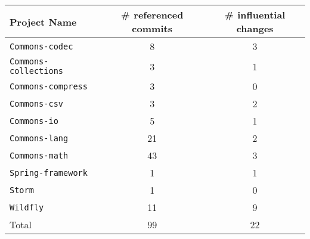 \centering
\resizebox{0.8\linewidth}{!}
{
\begin{tabular}{lcc}
    Project Name & \# referenced commits & \# influential changes\\
\toprule

{\tt Commons-codec} & 8 & 3 \\
{\tt Commons-collections} & 3 & 1 \\
{\tt Commons-compress} & 3 & 0 \\
{\tt Commons-csv} & 3 & 2 \\
{\tt Commons-io} & 5 & 1 \\
{\tt Commons-lang} & 21 & 2 \\
{\tt Commons-math} & 43 & 3 \\
{\tt Spring-framework} & 1 & 1 \\
{\tt Storm} & 1 & 0 \\
{\tt Wildfly} & 11 & 9 \\
\midrule
Total & 99 & 22 \\
\bottomrule

\end{tabular}
}
